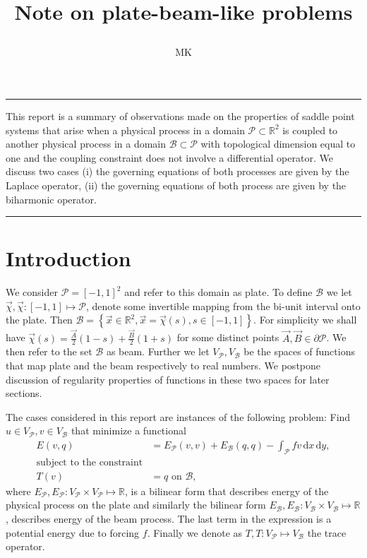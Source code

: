 \documentclass[a4paper,10pt]{article}
\newcommand{\R}{\ensuremath{\mathbb{R}}}
\newcommand{\meas}[1]{\ensuremath{\,\mathrm{d}#1}}
\newcommand{\Vp}{\ensuremath{V_{\mathcal{P}}}}
\newcommand{\Vb}{\ensuremath{V_{\mathcal{B}}}}
\newcommand{\Ep}{\ensuremath{E_{\mathcal{P}}}}
\newcommand{\Eb}{\ensuremath{E_{\mathcal{B}}}}
\renewenvironment{abstract}{%
\hfill\begin{minipage}{0.95\textwidth}
\rule{\textwidth}{1pt}}
{\par\noindent\rule{\textwidth}{1pt}\end{minipage}}
\begin{document}
%
\title{\begin{center}
        Note on plate-beam-like problems
       \end{center}}
\author[1]{MK}
%
\maketitle
%
\begin{abstract}
  This report is a summary of observations made on the properties of saddle
  point systems that arise when a physical process in a domain
  $\mathcal{P}\subset\R^2$ is coupled to another physical process in a domain
  $\mathcal{B}\subset\mathcal{P}$ with topological dimension equal to one and
  the coupling constraint does not involve a differential operator. We discuss
  two cases (i) the governing equations of both processes are given by the
  Laplace operator, (ii) the governing equations of both process are given by
  the biharmonic operator.
\end{abstract}

\section{Introduction}
  We consider $\mathcal{P}=\left[-1, 1\right]^2$ and refer to this domain as
  plate. To define $\mathcal{B}$ we let
  $\vec{\chi}, \vec{\chi}:\left[-1, 1\right]\mapsto\mathcal{P}$, denote some
  invertible mapping from the bi-unit interval onto the plate. Then
  $\mathcal{B}=\left\{\vec{x}\in\R^2, \vec{x}=\vec{\chi}(s), s\in\left[-1,
  1\right]\right\}$. For simplicity we shall have
  $\vec{\chi}(s)=\frac{\vec{A}}{2}(1-s) +\frac{\vec{B}}{2}(1+s)$ for some
  distinct points $\vec{A}, \vec{B}\in\partial\mathcal{P}$. We then refer to
  the set $\mathcal{B}$ as beam. Further we let $V_{\mathcal{P}}, V_{\mathcal{B}}$
  be the spaces of functions that map plate and the beam respectively to real
  numbers. We postpone discussion of regularity properties of functions in these
  two spaces for later sections.

  The cases considered in this report are instances of the following
  problem: Find $u\in\Vp, v\in\Vb$ that minimize a functional
  \begin{equation}
    \label{eq:energy}
    \begin{aligned}
      E(v, q) &= \Ep(v, v) + \Eb(q, q) - \int_{\mathcal{P}}f v \meas{x}\meas{y}, \\
      \text{subject to the constraint}&\\
      T(v) &= q\text{ on }\mathcal{B},
    \end{aligned}
  \end{equation}
  where $\Ep, \Ep: \Vp\times\Vp\mapsto\R$, is a bilinear form that describes
  energy of the physical process on the plate and similarly the bilinear form
  $\Eb, \Eb:\Vb\times\Vb\mapsto\R$, describes energy of the beam process. The
  last term in the expression is a potential energy due to forcing $f$. Finally
  we denote as $T, T:\Vp\mapsto\Vb$ the trace operator.
  
\end{document}
